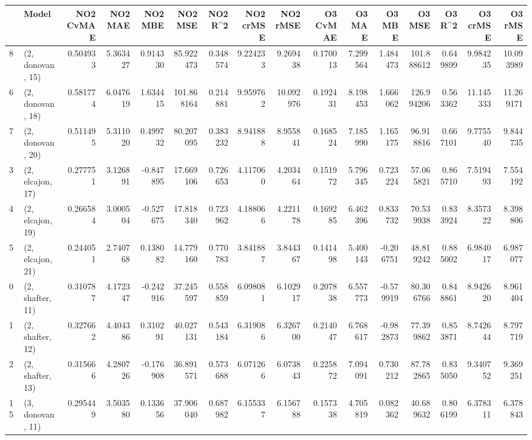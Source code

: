\begin{tabular}{llrrrrrrrrrrrrrr}
\toprule
{} &             Model &  NO2 CvMAE &   NO2 MAE &   NO2 MBE &     NO2 MSE &   NO2 R\textasciicircum2 &  NO2 crMSE &   NO2 rMSE &  O3 CvMAE &    O3 MAE &    O3 MBE &      O3 MSE &    O3 R\textasciicircum2 &   O3 crMSE &    O3 rMSE \\
\midrule
8  &  (2, donovan, 15) &   0.504933 &  5.363427 &  0.914330 &   85.922473 &  0.348574 &   9.224233 &   9.269438 &  0.170013 &  7.299564 &  1.484473 &  101.888612 &  0.649899 &   9.984235 &  10.093989 \\
6  &  (2, donovan, 18) &   0.581774 &  6.047619 &  1.634415 &  101.868164 &  0.214881 &   9.959762 &  10.092976 &  0.192431 &  8.198453 &  1.666062 &  126.994206 &  0.563362 &  11.145333 &  11.269171 \\
7  &  (2, donovan, 20) &   0.511495 &  5.311020 &  0.499732 &   80.207095 &  0.383232 &   8.941888 &   8.955841 &  0.168524 &  7.185990 &  1.165175 &   96.918816 &  0.667101 &   9.775540 &   9.844735 \\
3  &  (2, elcajon, 17) &   0.277751 &  3.126891 & -0.847895 &   17.669106 &  0.726653 &   4.117060 &   4.203464 &  0.151972 &  5.796345 &  0.723224 &   57.065821 &  0.865710 &   7.519493 &   7.554192 \\
4  &  (2, elcajon, 19) &   0.266584 &  3.000504 & -0.527675 &   17.818340 &  0.723962 &   4.188066 &   4.221178 &  0.169285 &  6.462396 &  0.833732 &   70.539938 &  0.833924 &   8.357322 &   8.398806 \\
5  &  (2, elcajon, 21) &   0.244051 &  2.740768 &  0.138082 &   14.779160 &  0.770783 &   3.841887 &   3.844367 &  0.141498 &  5.400143 & -0.206751 &   48.819242 &  0.885002 &   6.984017 &   6.987077 \\
0  &  (2, shafter, 11) &   0.310787 &  4.172347 & -0.242916 &   37.245597 &  0.558859 &   6.098081 &   6.102917 &  0.207838 &  6.557773 & -0.579919 &   80.306766 &  0.848861 &   8.942620 &   8.961404 \\
1  &  (2, shafter, 12) &   0.327662 &  4.404386 &  0.310291 &   40.027131 &  0.543184 &   6.319086 &   6.326700 &  0.214047 &  6.768617 & -0.982873 &   77.399862 &  0.853871 &   8.742644 &   8.797719 \\
2  &  (2, shafter, 13) &   0.315666 &  4.280726 & -0.176908 &   36.891571 &  0.573688 &   6.071266 &   6.073843 &  0.225872 &  7.094091 &  0.730212 &   87.782865 &  0.835050 &   9.340752 &   9.369251 \\
15 &  (3, donovan, 11) &   0.295449 &  3.503580 &  0.133656 &   37.906040 &  0.687982 &   6.155337 &   6.156788 &  0.157338 &  4.705819 &  0.082362 &   40.689632 &  0.806199 &   6.378311 &   6.378843 \\

\end{tabular}
